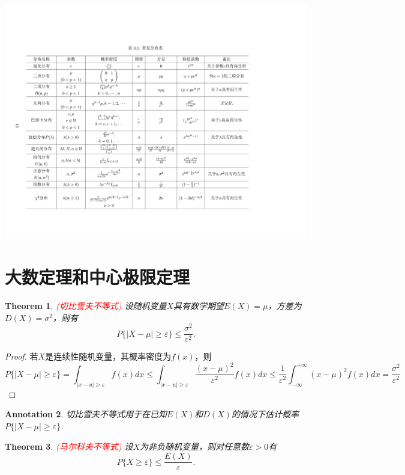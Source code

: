 \documentclass{article}
\newtheorem{theorem}{Theorem}[section]
\newtheorem{annotation}[theorem]{Annotation}
\newcommand{\redt}[1]{\textcolor{red}{#1}}
\begin{document}
\includegraphics[scale=0.2]{images/regular_distribution_characterize.jpg}


\newpage
\section{大数定理和中心极限定理}

\begin{theorem}
\rm \redt{(切比雪夫不等式)} 设随机变量$X$具有数学期望$E(X)=\mu$，方差为$D(X) = \sigma^2$，则有
$$
P\{|X-\mu| \geq \varepsilon \} \leq \frac{\sigma^2}{\varepsilon^2}. 
$$
\end{theorem}

\begin{proof}
若$X$是连续性随机变量，其概率密度为$f(x)$，则
$$
P\{|X-\mu| \geq \varepsilon \} = \int_{|x-u| \geq \varepsilon} f(x)dx \leq \int_{|x-u| \geq \varepsilon} \frac{(x-\mu)^2}{\varepsilon^2}f(x)dx \leq \frac{1}{\varepsilon^2}\int_{-\infty}^{+\infty}(x-\mu)^2f(x)dx =\frac{\sigma^2}{\varepsilon^2}
$$
\end{proof}

\begin{annotation}
\rm 切比雪夫不等式用于在已知$E(X)$和$D(X)$的情况下估计概率$P\{|X-\mu|\geq \varepsilon\}$. 
\end{annotation}

\begin{theorem}
\rm \redt{(马尔科夫不等式)} 设$X$为非负随机变量，则对任意数$\varepsilon > 0$有
$$
P\{X \geq \varepsilon\} \leq \frac{E(X)}{\varepsilon}.
$$
\end{theorem}
\end{document}
